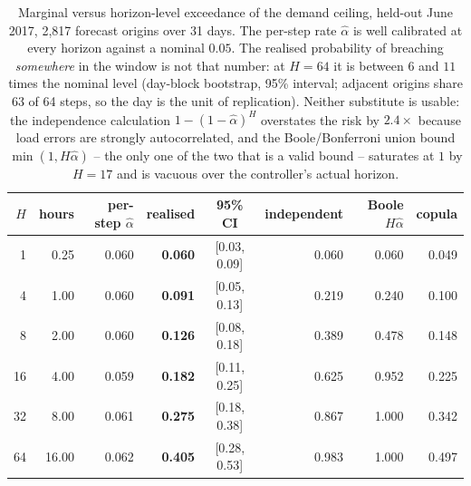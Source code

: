 \begin{table}[t]
\centering
\scriptsize
\setlength{\tabcolsep}{3pt}
\begin{tabular}{rrrrcrrr}
\toprule
$H$ & hours & per-step $\hat\alpha$ & realised & 95\% CI & independent & Boole $H\hat\alpha$ & copula \\
\midrule
1 & 0.25 & 0.060 & \textbf{0.060} & [0.03, 0.09] & 0.060 & 0.060 & 0.049 \\
4 & 1.00 & 0.060 & \textbf{0.091} & [0.05, 0.13] & 0.219 & 0.240 & 0.100 \\
8 & 2.00 & 0.060 & \textbf{0.126} & [0.08, 0.18] & 0.389 & 0.478 & 0.148 \\
16 & 4.00 & 0.059 & \textbf{0.182} & [0.11, 0.25] & 0.625 & 0.952 & 0.225 \\
32 & 8.00 & 0.061 & \textbf{0.275} & [0.18, 0.38] & 0.867 & 1.000 & 0.342 \\
64 & 16.00 & 0.062 & \textbf{0.405} & [0.28, 0.53] & 0.983 & 1.000 & 0.497 \\
\bottomrule
\end{tabular}
\caption{Marginal versus horizon-level exceedance of the demand ceiling, held-out June 2017, 2,817 forecast origins over 31 days. The per-step rate $\hat\alpha$ is well calibrated at every horizon against a nominal $0.05$. The realised probability of breaching \emph{somewhere} in the window is not that number: at $H=64$ it is between $6$ and $11$ times the nominal level (day-block bootstrap, 95\% interval; adjacent origins share 63 of 64 steps, so the day is the unit of replication). Neither substitute is usable: the independence calculation $1-(1-\hat\alpha)^H$ overstates the risk by $2.4\times$ because load errors are strongly autocorrelated, and the Boole/Bonferroni union bound $\min(1, H\hat\alpha)$ -- the only one of the two that is a valid bound -- saturates at $1$ by $H=17$ and is vacuous over the controller's actual horizon.}
\label{tab:horizon}
\end{table}

